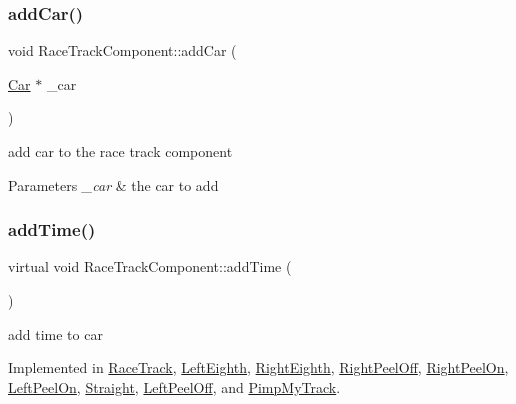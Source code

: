 \subsubsection{\texorpdfstring{add\+Car()}{addCar()}}
{\footnotesize\ttfamily void Race\+Track\+Component\+::add\+Car (\begin{DoxyParamCaption}\item[{\mbox{\hyperlink{class_car}{Car}} $\ast$}]{\+\_\+car }\end{DoxyParamCaption})\hspace{0.3cm}{\ttfamily [inline]}}

add car to the race track component 
\begin{DoxyParams}{Parameters}
{\em \+\_\+car} & the car to add \\
\hline
\end{DoxyParams}
\mbox{\label{class_race_track_component_aa815404c45ba7df3786c3add177eb7e6}} 
\subsubsection{\texorpdfstring{add\+Time()}{addTime()}}
{\footnotesize\ttfamily virtual void Race\+Track\+Component\+::add\+Time (\begin{DoxyParamCaption}{ }\end{DoxyParamCaption})\hspace{0.3cm}{\ttfamily [pure virtual]}}

add time to car 

Implemented in \mbox{\hyperlink{class_race_track_a9030a93ab510a49131fcbf1853d2fe81}{Race\+Track}}, \mbox{\hyperlink{class_left_eighth_a2bbed3b19b9d9842c7aadebd048b1884}{Left\+Eighth}}, \mbox{\hyperlink{class_right_eighth_adbe57086dd69560284c4df28fcd29221}{Right\+Eighth}}, \mbox{\hyperlink{class_right_peel_off_aa3097a53c5cf4b01495913cad798c1d4}{Right\+Peel\+Off}}, \mbox{\hyperlink{class_right_peel_on_aa37e19baf0ca3763e1912f85cbb0949b}{Right\+Peel\+On}}, \mbox{\hyperlink{class_left_peel_on_a4be64feefcd629c6dcb765175a9ea007}{Left\+Peel\+On}}, \mbox{\hyperlink{class_straight_ac73d5c8287446875ad28835f2d72a802}{Straight}}, \mbox{\hyperlink{class_left_peel_off_a579d92a784406a8b4060dec68a832db0}{Left\+Peel\+Off}}, and \mbox{\hyperlink{class_pimp_my_track_a79a8b871fe1c71263d8e4f5d091f87a6}{Pimp\+My\+Track}}.

